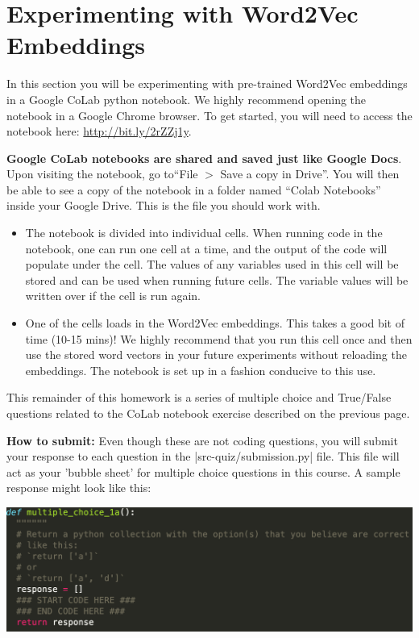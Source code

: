 \section{Experimenting with Word2Vec Embeddings}

In this section you will be experimenting with pre-trained Word2Vec embeddings in a Google CoLab python notebook. We highly recommend opening the notebook in a Google Chrome browser. To get started, you will need to access the notebook here: \url{http://bit.ly/2rZZj1y}.

\textbf{Google CoLab notebooks are shared and saved just like Google Docs}. Upon visiting the notebook, go to``File $>$ Save a copy in Drive''. You will then be able to see a copy of the notebook in a folder named “Colab Notebooks” inside your Google Drive. This is the file you should work with.

\begin{itemize}
    \item The notebook is divided into individual cells. When running code in the notebook, one can run one cell at a time, and the output of the code will populate under the cell. The values of any variables used in this cell will be stored and can be used when running future cells. The variable values will be written over if the cell is run again.  
    
    \item One of the cells loads in the Word2Vec embeddings. This takes a good bit of time (10-15 mins)! We highly recommend that you run this cell once and then use the stored word vectors in your future experiments without reloading the embeddings. The notebook is set up in a fashion conducive to this use.
\end{itemize}
\clearpage

This remainder of this homework is a series of multiple choice and True/False questions related to the CoLab notebook exercise described on the previous page.

{\bf How to submit:}  Even though these are not coding questions, you will submit your response to
each question in the |src-quiz/submission.py| file.  This file will act as
your 'bubble sheet' for multiple choice questions in this course.  A sample response
might look like this:

\begin{center}
\includegraphics[width=1\textwidth]{sample_question_empty.png}
\end{center}

